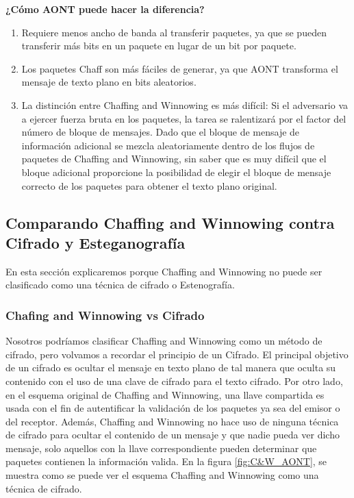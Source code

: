 \documentclass[12pt, a4paper, titlepage]{report}
\begin{document}
        \textbf{¿Cómo AONT puede hacer la diferencia?}\\
        \begin{enumerate}
            \item Requiere menos ancho de banda al transferir paquetes, ya que se pueden transferir más bits en un paquete en lugar de un bit por paquete.
            \item Los paquetes Chaff son más fáciles de generar, ya que AONT transforma el mensaje de texto plano en bits aleatorios.
            \item La distinción entre Chaffing and Winnowing es más difícil: Si el adversario va a ejercer fuerza bruta en los paquetes, la tarea se ralentizará por el factor del número de bloque de mensajes. Dado que el bloque de mensaje de información adicional se mezcla aleatoriamente dentro de los flujos de paquetes de Chaffing and Winnowing, sin saber que es muy difícil que el bloque adicional proporcione la posibilidad de elegir el bloque de mensaje correcto de los paquetes para obtener el texto plano original.
        \end{enumerate}
        
        \subsection{Comparando Chaffing and Winnowing contra Cifrado y Esteganograf\'ia}
        
        En esta sección explicaremos porque Chaffing and Winnowing no puede ser clasificado como una técnica de cifrado o Estenografía.\\
        
        \subsubsection{Chafing and Winnowing vs Cifrado}
        
        Nosotros podríamos clasificar Chaffing and Winnowing como un método de cifrado, pero volvamos a recordar el principio de un Cifrado.
        El principal objetivo de un cifrado es ocultar el mensaje en texto plano de tal manera que oculta su contenido con el uso de una clave de cifrado para el texto cifrado.
        Por otro lado, en el esquema original de Chaffing and Winnowing, una llave compartida es usada con el fin de autentificar la validación de los paquetes ya sea del emisor o del receptor. Además, Chaffing and Winnowing no hace uso de ninguna técnica de cifrado para ocultar el contenido de un mensaje y que nadie pueda ver dicho mensaje, solo aquellos con la llave correspondiente pueden determinar que paquetes contienen la información valida. En la figura \ref{fig:C&W_AONT}, se muestra como se puede ver el esquema Chaffing and Winnowing como una técnica de cifrado. \\
        
\end{document}
